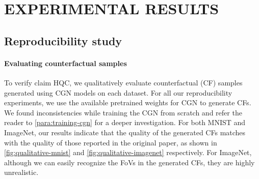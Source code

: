 \section{EXPERIMENTAL RESULTS}
\label{sec:results}

\subsection{Reproducibility study} \label{ssec:reproducibility-results}
\paragraph{Evaluating counterfactual samples} To verify claim HQC, we qualitatively evaluate counterfactual (CF) samples generated using CGN models on each dataset.
For all our reproducibility experiments, we use the available pretrained weights for CGN to generate CFs. We found inconsistencies while training the CGN from scratch and refer the reader to \cref{para:training-cgn} for a deeper investigation. For both MNIST and ImageNet, our results indicate that the quality of the generated CFs matches with the quality of those reported in the original paper, as shown in \cref{fig:qualitative-mnist} and \cref{fig:qualitative-imagenet} respectively. For ImageNet, although we can easily recognize the FoVs in the generated CFs, they are highly unrealistic.

